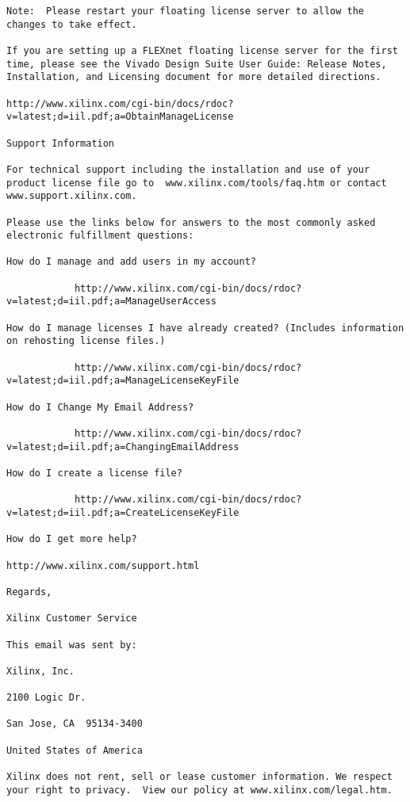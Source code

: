 \documentclass{article}
\begin{document}
\begin{verbatim}
Note:  Please restart your floating license server to allow the changes to take effect.

If you are setting up a FLEXnet floating license server for the first time, please see the Vivado Design Suite User Guide: Release Notes, Installation, and Licensing document for more detailed directions.

http://www.xilinx.com/cgi-bin/docs/rdoc?v=latest;d=iil.pdf;a=ObtainManageLicense

Support Information

For technical support including the installation and use of your product license file go to  www.xilinx.com/tools/faq.htm or contact www.support.xilinx.com. 

Please use the links below for answers to the most commonly asked electronic fulfillment questions:

How do I manage and add users in my account?

            http://www.xilinx.com/cgi-bin/docs/rdoc?v=latest;d=iil.pdf;a=ManageUserAccess

How do I manage licenses I have already created? (Includes information on rehosting license files.)

            http://www.xilinx.com/cgi-bin/docs/rdoc?v=latest;d=iil.pdf;a=ManageLicenseKeyFile

How do I Change My Email Address?

            http://www.xilinx.com/cgi-bin/docs/rdoc?v=latest;d=iil.pdf;a=ChangingEmailAddress

How do I create a license file?

            http://www.xilinx.com/cgi-bin/docs/rdoc?v=latest;d=iil.pdf;a=CreateLicenseKeyFile

How do I get more help?

http://www.xilinx.com/support.html

Regards, 

Xilinx Customer Service

This email was sent by:

Xilinx, Inc.

2100 Logic Dr.

San Jose, CA  95134-3400

United States of America

Xilinx does not rent, sell or lease customer information. We respect your right to privacy.  View our policy at www.xilinx.com/legal.htm.
 
 
 
 
\end{verbatim}
 
 
 
 
\end{document}
